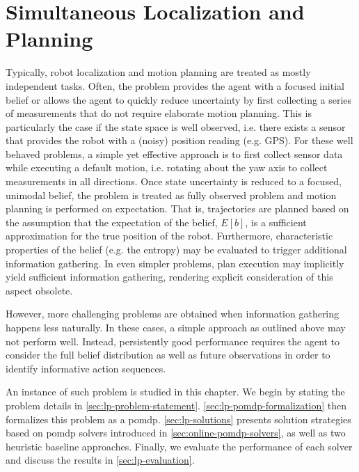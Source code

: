 \chapter{Simultaneous Localization and Planning}\label{chap:localization-and-planning}

Typically, robot localization and motion planning are treated as mostly
independent tasks. Often, the problem provides the agent with a focused initial
belief or allows the agent to quickly reduce uncertainty by first collecting
a series of measurements that do not require elaborate motion planning. This is
particularly the case if the state space is well observed, i.e. there exists
a sensor that provides the robot with a (noisy) position reading (e.g. GPS).
For these well behaved problems, a simple yet effective approach is to first
collect sensor data while executing a default motion, i.e. rotating about the
yaw axis to collect measurements in all directions. Once state uncertainty is
reduced to a focused, unimodal belief, the problem is treated as fully observed
problem and motion planning is performed on expectation. That is, trajectories
are planned based on the assumption that the expectation of the belief, $E[b]$,
is a sufficient approximation for the true position of the robot. Furthermore,
characteristic properties of the belief (e.g. the entropy) may be evaluated
to trigger additional information gathering. In even simpler problems, plan
execution may implicitly yield sufficient information gathering, rendering
explicit consideration of this aspect obsolete.

However, more challenging problems are obtained when information gathering
happens less naturally. In these cases, a simple approach as outlined above
may not perform well. Instead, persistently good performance requires the agent
to consider the full belief distribution as well as future observations in
order to identify informative action sequences.

An instance of such problem is studied in this chapter. We begin by stating the
problem details in \cref{sec:lp-problem-statement}.
\cref{sec:lp-pomdp-formalization} then formalizes this problem as a \ac{pomdp}.
\cref{sec:lp-solutions} presents solution strategies based on \ac{pomdp}
solvers introduced in \cref{sec:online-pomdp-solvers}, as well as two heuristic
baseline approaches. Finally, we evaluate the performance of each solver and
discuss the results in \cref{sec:lp-evaluation}.

